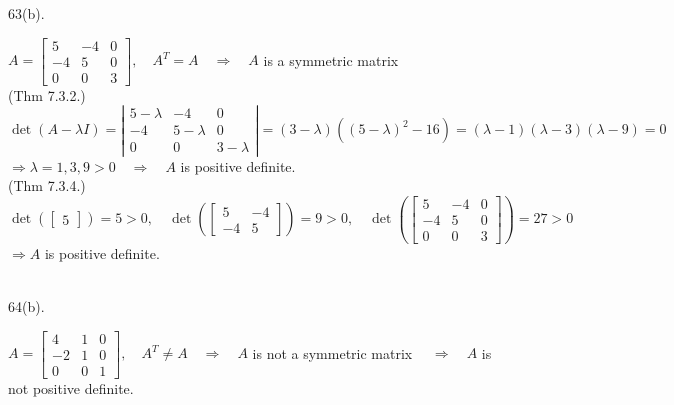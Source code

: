 \documentclass[12pt]{book}
\begin{document}
\begin{CJK}{UTF8}{bsmi}
63(b). \begin{minipage}[t]{\dimexpr\linewidth-2em}
$A=\begin{bmatrix}
5 & -4 & 0 \\
-4 & 5 & 0 \\
0 &  0 & 3
\end{bmatrix},\quad A^T=A\quad\Rightarrow\quad A$ is a symmetric matrix \\
(Thm 7.3.2.) $\det(A-\lambda I)=\left|\begin{matrix}
5-\lambda & -4 & 0 \\
-4 & 5-\lambda & 0 \\
0 &  0 & 3-\lambda
\end{matrix}\right|=(3-\lambda)((5-\lambda)^2-16)=(\lambda-1)(\lambda-3)(\lambda-9)=0$ \\
$\Rightarrow\lambda=1, 3, 9>0\quad\Rightarrow\quad A$ is positive definite. \\
(Thm 7.3.4.) $\det\left(\begin{bmatrix}
5
\end{bmatrix}\right)=5>0,\quad\det\left(\begin{bmatrix}
5 & -4 \\
-4 & 5
\end{bmatrix}\right)=9>0,\quad\det\left(\begin{bmatrix}
5 & -4 & 0 \\
-4 & 5 & 0 \\
0 &  0 & 3
\end{bmatrix}\right)=27>0$ \\
$\Rightarrow A$ is positive definite.
\end{minipage}\\

64(b). \begin{minipage}[t]{\dimexpr\linewidth-2em}
$A=\begin{bmatrix}
4 & 1 & 0 \\
-2 & 1 & 0 \\
0 &  0 & 1
\end{bmatrix},\quad A^T\ne A\quad\Rightarrow\quad A$ is not a symmetric matrix $\quad\Rightarrow\quad A$ is not positive definite. \\
\end{minipage}\\


\end{CJK}
\end{document}
